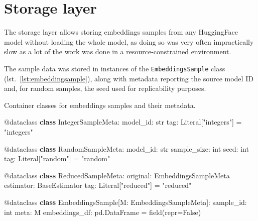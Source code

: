 \documentclass[
  a4paper, twoside, 10pt, titlepage]{book}
\newenvironment{Shaded}{}{}
\newcommand{\AttributeTok}[1]{\textcolor[rgb]{0.49,0.56,0.16}{#1}}
\newcommand{\BuiltInTok}[1]{\textcolor[rgb]{0.00,0.50,0.00}{#1}}
\newcommand{\KeywordTok}[1]{\textcolor[rgb]{0.00,0.44,0.13}{\textbf{#1}}}
\newcommand{\NormalTok}[1]{#1}
\newcommand{\OperatorTok}[1]{\textcolor[rgb]{0.40,0.40,0.40}{#1}}
\newcommand{\StringTok}[1]{\textcolor[rgb]{0.25,0.44,0.63}{#1}}
\newcommand{\VariableTok}[1]{\textcolor[rgb]{0.10,0.09,0.49}{#1}}
\begin{document}
\clearpage

\section{Storage layer}\label{storage-layer}

The storage layer allows storing embeddings samples from any HuggingFace
model without loading the whole model, as doing so was very often
impractically slow as a lot of the work was done in a
resource-constrained environment.

The sample data was stored in instances of the \texttt{EmbeddingsSample}
class (lst.~\ref{lst:embeddingsample}), along with metadata reporting
the source model ID and, for random samples, the seed used for
replicability purposes.

\begin{codelisting}

\caption{Container classes for embeddings samples and their
metadata.}\label{lst:embeddingsample}

\begin{Shaded}
\begin{Highlighting}[]

\AttributeTok{@dataclass}
\KeywordTok{class}\NormalTok{ IntegerSampleMeta:}
\NormalTok{    model\_id: }\BuiltInTok{str}
\NormalTok{    tag: Literal[}\StringTok{"integers"}\NormalTok{] }\OperatorTok{=} \StringTok{"integers"}

\AttributeTok{@dataclass}
\KeywordTok{class}\NormalTok{ RandomSampleMeta:}
\NormalTok{model\_id: }\BuiltInTok{str}
\NormalTok{    sample\_size: }\BuiltInTok{int}
\NormalTok{    seed: }\BuiltInTok{int}
\NormalTok{    tag: Literal[}\StringTok{"random"}\NormalTok{] }\OperatorTok{=} \StringTok{"random"}

\AttributeTok{@dataclass}
\KeywordTok{class}\NormalTok{ ReducedSampleMeta:}
\NormalTok{    original: EmbeddingsSampleMeta}
\NormalTok{    estimator: BaseEstimator}
\NormalTok{    tag: Literal[}\StringTok{"reduced"}\NormalTok{] }\OperatorTok{=} \StringTok{"reduced"}

\AttributeTok{@dataclass}
\KeywordTok{class}\NormalTok{ EmbeddingsSample[M: EmbeddingsSampleMeta]:}
\NormalTok{    sample\_id: }\BuiltInTok{int}
\NormalTok{    meta: M}
\NormalTok{    embeddings\_df: pd.DataFrame }\OperatorTok{=}\NormalTok{ field(}\BuiltInTok{repr}\OperatorTok{=}\VariableTok{False}\NormalTok{)}
\end{Highlighting}
\end{Shaded}

\end{codelisting}
\end{document}
